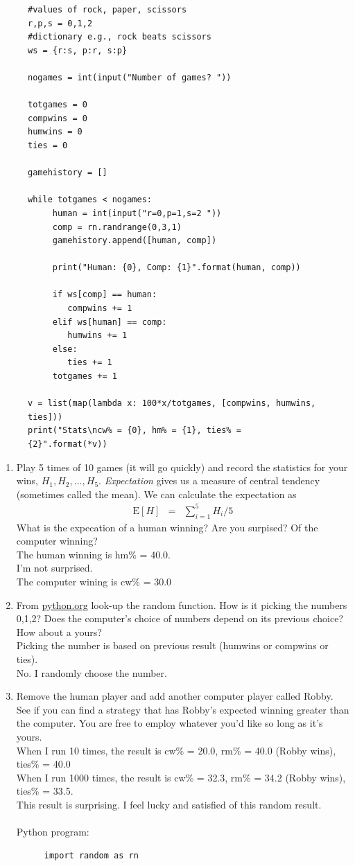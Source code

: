 \documentclass{article}
\begin{document}
\begin{enumerate}
\begin{figure}[h]
{\begin{verbatim}
#values of rock, paper, scissors
r,p,s = 0,1,2
#dictionary e.g., rock beats scissors
ws = {r:s, p:r, s:p}

nogames = int(input("Number of games? "))

totgames = 0
compwins = 0
humwins = 0
ties = 0

gamehistory = []

while totgames < nogames:
     human = int(input("r=0,p=1,s=2 "))
     comp = rn.randrange(0,3,1)
     gamehistory.append([human, comp])

     print("Human: {0}, Comp: {1}".format(human, comp))

     if ws[comp] == human:
        compwins += 1
     elif ws[human] == comp:
        humwins += 1
     else:
        ties += 1
     totgames += 1

v = list(map(lambda x: 100*x/totgames, [compwins, humwins, ties]))
print("Stats\ncw% = {0}, hm% = {1}, ties% = {2}".format(*v))
\end{verbatim}}
\end{figure}
\begin{enumerate}
\item Play 5 times of 10 games (it will go quickly) and record the statistics for your wins, $H_1, H_2, \ldots, H_5$.   {\it Expectation} gives us a measure of central tendency (sometimes called the mean).  We can calculate the expectation as
\begin{eqnarray*}
\mathrm{E}[H] &=& \sum_{i=1}^5 H_i/5
\end{eqnarray*}
What is the expecation of a human winning? Are you surpised? Of the computer winning?
\\ The human winning is hm\% = 40.0.
\\ I'm not surprised.
\\ The computer wining is cw\% = 30.0
\item From \url{python.org} look-up the random function.  How is it picking the numbers 0,1,2?  Does the computer's choice of numbers depend on its previous choice? How about a yours?
\\ Picking the number is based on previous result (humwins or compwins or ties). 
\\ No. I randomly choose the number.
\item Remove the human player and add another computer player called Robby.  See if you can find a strategy that has Robby's expected winning greater than the computer.  You are free to employ whatever you'd like so long as it's yours.
\\ When I run 10 times, the result is cw\% = 20.0, rm\% = 40.0 (Robby wins), ties\% = 40.0
\\ When I run 1000 times, the result is cw\% = 32.3, rm\% = 34.2 (Robby wins), ties\% = 33.5.
\\ This result is surprising. I feel lucky and satisfied of this random result.
\\
\\ Python program:
\begin{figure}[h]
{\small
\begin{verbatim}
import random as rn


\end{verbatim}}
\end{figure}
\end{enumerate}
\end{enumerate}
\end{document}
